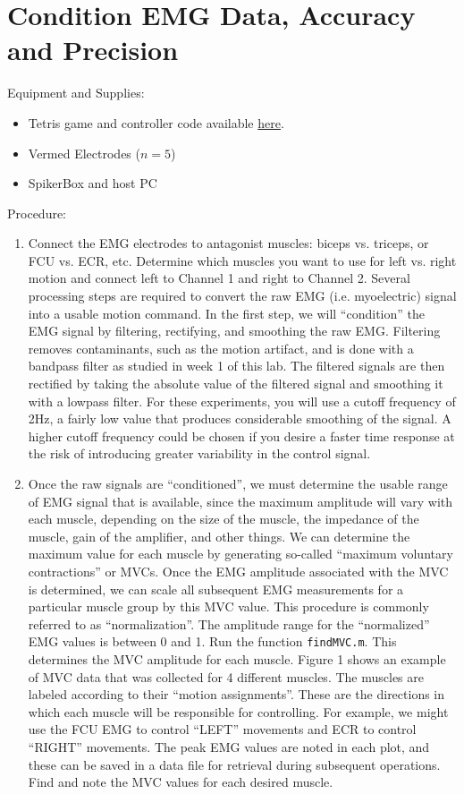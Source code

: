 \documentclass[10pt,oneside,a4paper]{article}
\begin{document}
\section{Condition EMG Data, Accuracy and Precision}
Equipment and Supplies: \\
\begin{itemize}
\item Tetris game and controller code available \href{https://github.com/mfliu/Myoelectric_Tetris} {\color{blue} here}. 
\item Vermed Electrodes ($n=5$)
\item SpikerBox and host PC
\end{itemize}
Procedure:
\begin{enumerate}
\item Connect the EMG electrodes to antagonist muscles: biceps vs. triceps, or FCU vs. ECR, etc. Determine which muscles you want to use for left vs. right motion and connect left to Channel 1 and right to Channel 2. Several processing steps are required to convert the raw EMG (i.e. myoelectric) signal into a usable motion command. In the first step, we will ``condition'' the EMG signal by filtering, rectifying, and smoothing the raw EMG. Filtering removes contaminants, such as the motion artifact, and is done with a bandpass filter as studied in week 1 of this lab. The filtered signals are then rectified by taking the absolute value of the filtered signal and smoothing it with a lowpass filter. For these experiments, you will use a cutoff frequency of 2Hz, a fairly low value that produces considerable smoothing of the signal. A higher cutoff frequency could be chosen if you desire a faster time response at the risk of introducing greater variability in the control signal. 
\item Once the raw signals are ``conditioned'', we must determine the usable range of EMG signal that is available, since the maximum amplitude will vary with each muscle, depending on the size of the muscle, the impedance of the muscle, gain of the amplifier, and other things. We can determine the maximum value for each muscle by generating so-called ``maximum voluntary contractions'' or MVCs. Once the EMG amplitude associated with the MVC is determined, we can scale all subsequent EMG measurements for a particular muscle group by this MVC value. This procedure is commonly referred to as ``normalization''. The amplitude range for the ``normalized'' EMG values is between 0 and 1. Run the function \texttt{findMVC.m}. This determines the MVC amplitude for each muscle. Figure 1 shows an example of MVC data that was collected for 4 different muscles. The muscles are labeled according to their ``motion assignments''. These are the directions in which each muscle will be responsible for controlling. For example, we might use the FCU EMG to control ``LEFT'' movements and ECR to control ``RIGHT'' movements. The peak EMG values are noted in each plot, and these can be saved in a data file for retrieval during subsequent operations.  Find and note the MVC values for each desired muscle.

\end{enumerate}
\end{document}
